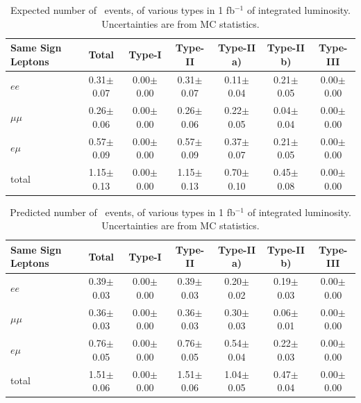 \begin{table}[hbt]
\begin{center}
\begin{tabular}{|l|c|c|c|c|c|c|}\hline
Same Sign Leptons & Total &      Type-I &  Type-II & Type-II a) & Type-II b) & Type-III \\ \hline

$ee$ & 0.31$\pm$0.07 & 0.00$\pm$0.00 & 0.31$\pm$0.07 & 0.11$\pm$0.04 & 0.21$\pm$0.05 & 0.00$\pm$0.00 \\
$\mu\mu$ & 0.26$\pm$0.06 & 0.00$\pm$0.00 & 0.26$\pm$0.06 & 0.22$\pm$0.05 & 0.04$\pm$0.04 & 0.00$\pm$0.00 \\
$e\mu$ & 0.57$\pm$0.09 & 0.00$\pm$0.00 & 0.57$\pm$0.09 & 0.37$\pm$0.07 & 0.21$\pm$0.05 & 0.00$\pm$0.00 \\
total & 1.15$\pm$0.13 & 0.00$\pm$0.00 & 1.15$\pm$0.13 & 0.70$\pm$0.10 & 0.45$\pm$0.08 & 0.00$\pm$0.00 \\ \hline

\end{tabular}
\caption{ Expected number of \ttbar\ events, of various types in 1 fb$^{-1}$ of integrated luminosity. Uncertainties are from MC statistics.\label{tab:fakeOrigin1}}
\end{center}
\end{table}

\begin{table}[hbt]
\begin{center}
\begin{tabular}{|l|c|c|c|c|c|c|}\hline
Same Sign Leptons & Total &      Type-I &  Type-II & Type-II a) & Type-II b) & Type-III \\ \hline

$ee$ & 0.39$\pm$0.03 & 0.00$\pm$0.00 & 0.39$\pm$0.03 & 0.20$\pm$0.02 & 0.19$\pm$0.03 & 0.00$\pm$0.00 \\
$\mu\mu$ & 0.36$\pm$0.03 & 0.00$\pm$0.00 & 0.36$\pm$0.03 & 0.30$\pm$0.03 & 0.06$\pm$0.01 & 0.00$\pm$0.00 \\
$e\mu$ & 0.76$\pm$0.05 & 0.00$\pm$0.00 & 0.76$\pm$0.05 & 0.54$\pm$0.04 & 0.22$\pm$0.03 & 0.00$\pm$0.00 \\
total & 1.51$\pm$0.06 & 0.00$\pm$0.00 & 1.51$\pm$0.06 & 1.04$\pm$0.05 & 0.47$\pm$0.04 & 0.00$\pm$0.00 \\ \hline

\end{tabular}
\caption{ Predicted number of \ttbar\ events, of various types in 1 fb$^{-1}$ of integrated luminosity. Uncertainties are from MC statistics.\label{tab:fakeOrigin2}}
\end{center}
\end{table}

